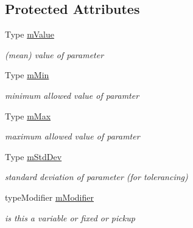 \subsection*{Protected Attributes}
\begin{DoxyCompactItemize}
\item 
Type \hyperlink{classParameter_a631a80711abe692a1ce7af67abc0a097}{m\+Value}\hypertarget{classParameter_a631a80711abe692a1ce7af67abc0a097}{}\label{classParameter_a631a80711abe692a1ce7af67abc0a097}

\begin{DoxyCompactList}\small\item\em (mean) value of parameter \end{DoxyCompactList}\item 
Type \hyperlink{classParameter_a725584b7a8af84b3e5f811b27b12615f}{m\+Min}\hypertarget{classParameter_a725584b7a8af84b3e5f811b27b12615f}{}\label{classParameter_a725584b7a8af84b3e5f811b27b12615f}

\begin{DoxyCompactList}\small\item\em minimum allowed value of paramter \end{DoxyCompactList}\item 
Type \hyperlink{classParameter_a67920b1bd3610cc8fcb43f1811d31e4b}{m\+Max}\hypertarget{classParameter_a67920b1bd3610cc8fcb43f1811d31e4b}{}\label{classParameter_a67920b1bd3610cc8fcb43f1811d31e4b}

\begin{DoxyCompactList}\small\item\em maximum allowed value of paramter \end{DoxyCompactList}\item 
Type \hyperlink{classParameter_a23b648958657c9949667af624bcac95b}{m\+Std\+Dev}\hypertarget{classParameter_a23b648958657c9949667af624bcac95b}{}\label{classParameter_a23b648958657c9949667af624bcac95b}

\begin{DoxyCompactList}\small\item\em standard deviation of parameter (for tolerancing) \end{DoxyCompactList}\item 
type\+Modifier \hyperlink{classParameter_a8e555cfec6a44778d4d04a81831c445e}{m\+Modifier}\hypertarget{classParameter_a8e555cfec6a44778d4d04a81831c445e}{}\label{classParameter_a8e555cfec6a44778d4d04a81831c445e}

\begin{DoxyCompactList}\small\item\em is this a variable or fixed or pickup \end{DoxyCompactList}\end{DoxyCompactItemize}


